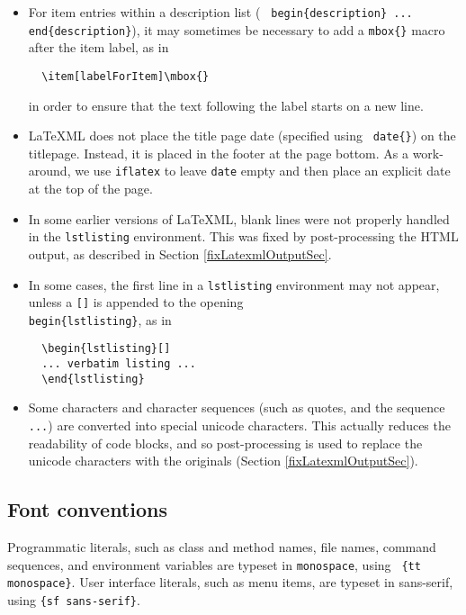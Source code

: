 \documentclass{article}
\begin{document}
\begin{itemize}

\item For item entries within a description list ( {\tt \BKS
begin\{description\} ... \BKS end\{description\}}), it may sometimes
be necessary to add a {\tt \BKS mbox\{\}} macro after the item
label, as in
\begin{verbatim}
  \item[labelForItem]\mbox{}
\end{verbatim}
in order to ensure that the text following the label starts on a new
line.

\item LaTeXML does not place the title page date (specified using {\tt
\BKS date\{\}}) on the titlepage. Instead, it is placed in the
footer at the page bottom. As a work-around, we use {\tt \BKS iflatex} to
leave {\tt \BKS date} empty and then place an explicit date at the top of
the page.

\item In some earlier versions of LaTeXML, blank lines were not
properly handled in the {\tt lstlisting} environment. This was fixed by
post-processing the HTML output, as described in Section
\ref{fixLatexmlOutputSec}.

\item In some cases, the first line in a {\tt lstlisting} environment
may not appear, unless a {\tt []} is appended to the opening \\
{\tt \BKS begin\{lstlisting\}}, as in
%
\begin{verbatim}
  \begin{lstlisting}[]
  ... verbatim listing ...
  \end{lstlisting}
\end{verbatim}
%

\item Some characters and character sequences (such as quotes, and the
sequence {\tt ...}) are converted into special unicode characters.
This actually reduces the readability of code blocks, and so
post-processing is used to replace the unicode characters with the
originals (Section \ref{fixLatexmlOutputSec}).

\end{itemize}

\subsection{Font conventions}

Programmatic literals, such as class and method names, file names, 
command sequences, and
environment variables are typeset in {\tt monospace}, using {\tt
\{\BKS tt monospace\}}. User interface literals, such as menu items, are
typeset in {\sf sans-serif}, using {\tt \{\BKS sf sans-serif\}}.
\end{document}

